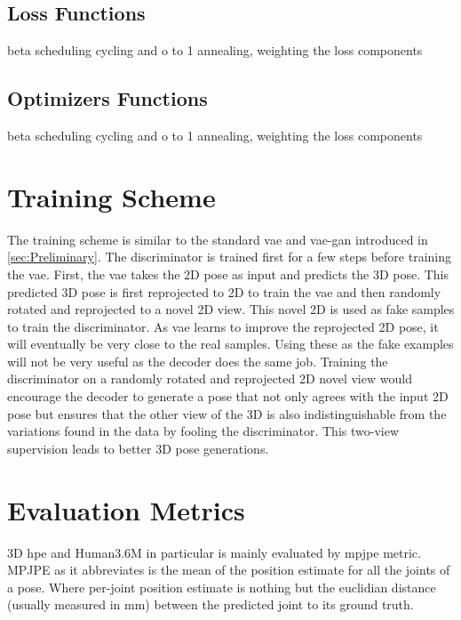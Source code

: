 \subsection{Loss Functions}
beta scheduling cycling and o to 1 annealing, weighting the loss components

\subsection{Optimizers Functions}
beta scheduling cycling and o to 1 annealing, weighting the loss components


\section{Training Scheme}
The training scheme is similar to the standard \ac{vae} and \ac{vae}-\ac{gan} introduced in \ref{sec:Preliminary}. The discriminator is trained first for a few steps before training the \ac{vae}. First, the \ac{vae} takes the 2D pose as input and predicts the 3D pose. This predicted 3D pose is first reprojected to 2D to train the \ac{vae} and then randomly rotated and reprojected to a novel 2D view. This novel 2D is used as fake samples to train the discriminator. As \ac{vae} learns to improve the reprojected 2D pose, it will eventually be very close to the real samples. Using these as the fake examples will not be very useful as the decoder does the same job. Training the discriminator on a randomly rotated and reprojected 2D novel view would encourage the decoder to generate a pose that not only agrees with the input 2D pose but ensures that the other view of the 3D is also indistinguishable from the variations found in the data by fooling the discriminator. This two-view supervision leads to better 3D pose generations.


\section{Evaluation Metrics} %
3D \ac{hpe} and Human3.6M in particular is mainly evaluated by \ac{mpjpe} metric. MPJPE as it abbreviates is the mean of the position estimate for all the joints of a pose. Where per-joint position estimate is nothing but the euclidian distance (usually measured in mm) between the predicted joint to its ground truth.



